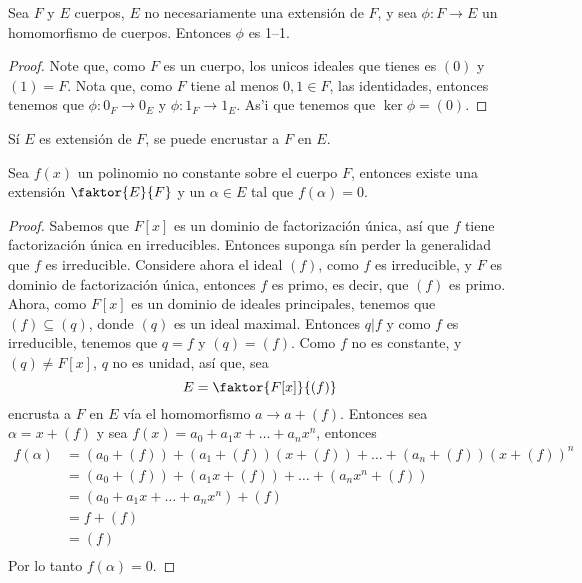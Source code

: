 \begin{lemma}\label{19.78}
    Sea $F$ y $E$ cuerpos, $E$ no necesariamente una extensi\'on de $F$, y sea
    $\phi:F \xrightarrow{} E$ un homomorfismo de cuerpos. Entonces $\phi$ es
    1--1.
\end{lemma}
\begin{proof}
    Note que, como $F$ es un cuerpo, los unicos ideales que tienes es $(0)$ y
    $(1)=F$. Nota que, como $F$ tiene al menos  $0,1 \in F$, las identidades,
    entonces tenemos que  $\phi:0_F \xrightarrow{} 0_E$ y $\phi:1_F
    \xrightarrow{} 1_E$. As'i que tenemos que $\ker{\phi}=(0)$.
\end{proof}
\begin{corollary}
    S\'i $E$ es extensi\'on de $F$, se puede encrustar a $F$ en  $E$.
\end{corollary}

\begin{theorem}\label{19.79}
    Sea $f(x)$ un polinomio no constante sobre el cuerpo $F$, entonces existe
    una extensi\'on  $\faktor{E}{F}$ y un $\alpha \in E$ tal que  $f(\alpha)=0$.
\end{theorem}
\begin{proof}
    Sabemos que $F[x]$ es un dominio de factorizaci\'on \'unica, as\'i que $f$
    tiene factorizaci\'on \'unica en irreducibles. Entonces suponga s\'in perder
    la generalidad que $f$ es irreducible. Considere ahora el ideal $(f)$, como
    $f$ es irreducible, y $F$ es dominio de factorizaci\'on \'unica, entonces
    $f$ es primo, es decir, que $(f)$ es primo. Ahora, como $F[x]$ es un dominio
    de ideales principales, tenemos que $(f) \subseteq (q)$, donde $(q)$ es un
    ideal maximal. Entonces $q|f$ y como  $f$ es irreducible, tenemos que $q=f$
    y $(q)=(f)$. Como $f$ no es constante, y $(q) \neq F[x]$, $q$ no es unidad,
    as\'i que, sea
    \begin{equation*}
        E=\faktor{F[x]}{(f)}
    \end{equation*}
    encrusta a $F$ en  $E$ v\'ia el homomorfismo  $a \xrightarrow{} a+(f)$.
    Entonces sea $\alpha=x+(f)$ y sea $f(x)=a_0+a_1x+\dots+a_nx^n$, entonces
    \begin{align*}
        f(\alpha) &=  (a_0+(f))+(a_1+(f))(x+(f))+\dots+(a_n+(f))(x+(f))^n   \\
             &= (a_0+(f))+(a_1x+(f))+\dots+(a_nx^n+(f)) \\
             &= (a_0+a_1x+\dots+a_nx^n)+(f) \\
             &= f+(f)   \\
             &= (f) \\
    \end{align*}
    Por lo tanto $f(\alpha)=0$.
\end{proof}

